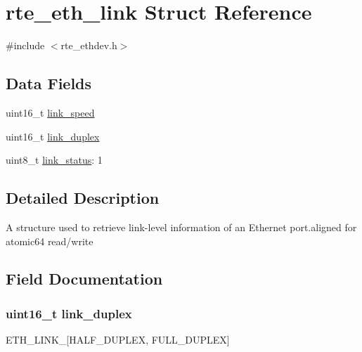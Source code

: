 \hypertarget{structrte__eth__link}{}\section{rte\+\_\+eth\+\_\+link Struct Reference}
\label{structrte__eth__link}


{\ttfamily \#include $<$rte\+\_\+ethdev.\+h$>$}

\subsection*{Data Fields}
\begin{DoxyCompactItemize}
\item 
uint16\+\_\+t \hyperlink{structrte__eth__link_a7d93770cafbfd72bb3bbd1aaec9894ab}{link\+\_\+speed}
\item 
uint16\+\_\+t \hyperlink{structrte__eth__link_a8a9a73e9e688ae4d72cf319872c0bdf1}{link\+\_\+duplex}
\item 
uint8\+\_\+t \hyperlink{structrte__eth__link_a81eeab45998a64b609a5fcf8435bdad1}{link\+\_\+status}\+: 1
\end{DoxyCompactItemize}


\subsection{Detailed Description}
A structure used to retrieve link-\/level information of an Ethernet port.\+aligned for atomic64 read/write 

\subsection{Field Documentation}
\hypertarget{structrte__eth__link_a8a9a73e9e688ae4d72cf319872c0bdf1}{}
\subsubsection[{link\+\_\+duplex}]{\setlength{\rightskip}{0pt plus 5cm}uint16\+\_\+t link\+\_\+duplex}\label{structrte__eth__link_a8a9a73e9e688ae4d72cf319872c0bdf1}
E\+T\+H\+\_\+\+L\+I\+N\+K\+\_\+\mbox{[}H\+A\+L\+F\+\_\+\+D\+U\+P\+L\+E\+X, F\+U\+L\+L\+\_\+\+D\+U\+P\+L\+E\+X\mbox{]} \hypertarget{structrte__eth__link_a7d93770cafbfd72bb3bbd1aaec9894ab}{}
